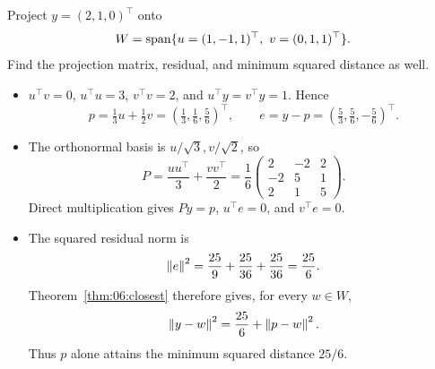 \begin{example}\label{example:06:projection}
Project \(y=(2,1,0)^\top\) onto
\[
W=\Span\{u=(1,-1,1)^\top,\ v=(0,1,1)^\top\}.
\]
Find the projection matrix, residual, and minimum squared distance as well.
\par\smallskip
{}
\begin{itemize}
\item \(u^\top v=0\), \(u^\top u=3\), \(v^\top v=2\), and
  \(u^\top y=v^\top y=1\). Hence
  \[
  p=\tfrac13u+\tfrac12v=(\tfrac13,\tfrac16,\tfrac56)^\top,
  \qquad e=y-p=(\tfrac53,\tfrac56,-\tfrac56)^\top.
  \]
\item The orthonormal basis is \(u/\sqrt3,v/\sqrt2\), so
  \[
  P=\frac{uu^\top}{3}+\frac{vv^\top}{2}
   =\frac16\begin{pmatrix}2&-2&2\\-2&5&1\\2&1&5\end{pmatrix}.
  \]
  Direct multiplication gives \(Py=p\), \(u^\top e=0\), and \(v^\top e=0\).
\item The squared residual norm is
  \[
  \left\lVert e\right\rVert^2=\frac{25}{9}+\frac{25}{36}+\frac{25}{36}=\frac{25}{6}.
  \]
  Theorem~\ref{thm:06:closest} therefore gives, for every \(w\in W\),
  \[
  \left\lVert y-w\right\rVert^2=\frac{25}{6}+\left\lVert p-w\right\rVert^2.
  \]
  Thus \(p\) alone attains the minimum squared distance \(25/6\).
\end{itemize}
\end{example}

